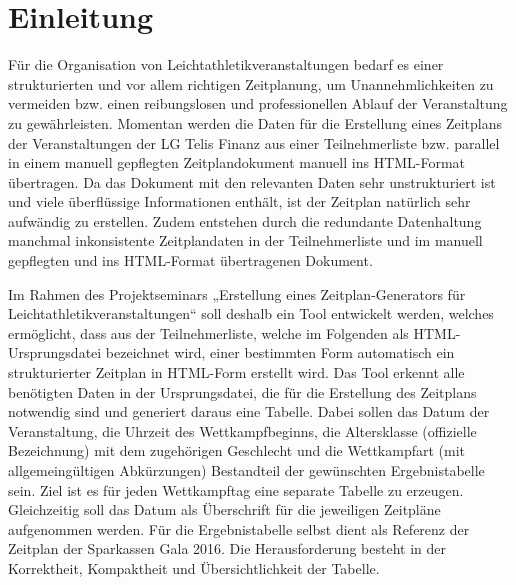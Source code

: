 
\chapter{Einleitung}
\label{chap:Einleitung}

Für die Organisation von Leichtathletikveranstaltungen bedarf es einer strukturierten und vor allem richtigen Zeitplanung, um Unannehmlichkeiten zu vermeiden bzw. einen reibungslosen und professionellen Ablauf der Veranstaltung zu gewährleisten. Momentan werden die Daten für die Erstellung eines Zeitplans der Veranstaltungen der LG Telis Finanz aus einer Teilnehmerliste bzw. parallel in einem manuell gepflegten Zeitplandokument manuell ins HTML-Format übertragen. Da das Dokument mit den relevanten Daten sehr unstrukturiert ist und viele überflüssige Informationen enthält, ist der Zeitplan natürlich sehr aufwändig zu erstellen. Zudem entstehen durch die redundante Datenhaltung manchmal inkonsistente Zeitplandaten in der Teilnehmerliste und im manuell gepflegten und ins HTML-Format übertragenen Dokument. 

Im Rahmen des Projektseminars „Erstellung eines Zeitplan-Generators für Leichtathletikveranstaltungen“ soll deshalb ein Tool entwickelt werden, welches ermöglicht, dass aus der Teilnehmerliste, welche im Folgenden als \ac{HTML}-Ursprungsdatei bezeichnet wird, einer bestimmten Form automatisch ein strukturierter Zeitplan in HTML-Form erstellt wird. Das Tool erkennt alle benötigten Daten in der Ursprungsdatei, die für die Erstellung des Zeitplans notwendig sind und generiert daraus eine Tabelle. Dabei sollen das Datum der Veranstaltung, die Uhrzeit des Wettkampfbeginns, die Altersklasse (offizielle Bezeichnung) mit dem zugehörigen Geschlecht und die Wettkampfart (mit allgemeingültigen Abkürzungen) Bestandteil der gewünschten Ergebnistabelle sein. Ziel ist es für jeden Wettkampftag eine separate Tabelle zu erzeugen. Gleichzeitig soll das Datum als Überschrift für die jeweiligen Zeitpläne aufgenommen werden. Für die Ergebnistabelle selbst dient als Referenz der Zeitplan der Sparkassen Gala 2016.
Die Herausforderung besteht in der Korrektheit, Kompaktheit und Übersichtlichkeit der Tabelle.

